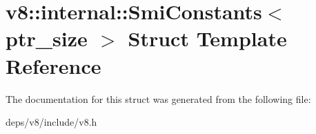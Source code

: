 \hypertarget{structv8_1_1internal_1_1_smi_constants}{}\section{v8\+:\+:internal\+:\+:Smi\+Constants$<$ ptr\+\_\+size $>$ Struct Template Reference}
\label{structv8_1_1internal_1_1_smi_constants}


The documentation for this struct was generated from the following file\+:\begin{DoxyCompactItemize}
\item 
deps/v8/include/v8.\+h\end{DoxyCompactItemize}
